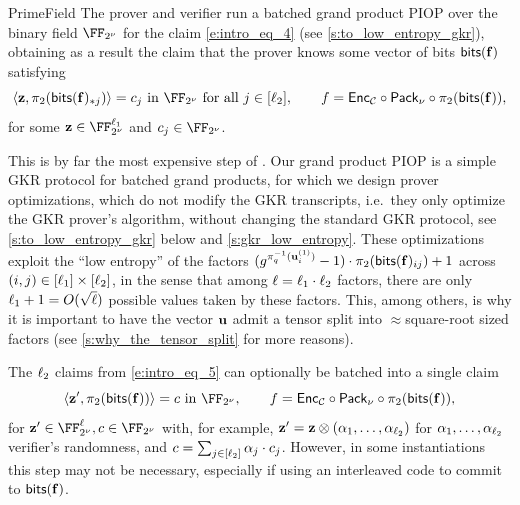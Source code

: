 \begin{lncsmove}{PrimeField}
        The prover and verifier run  a batched grand product PIOP over the binary field $\comfield$ for the claim  \eqref{e:intro_eq_4} (see \cref{s:to_low_entropy_gkr}), obtaining as a result the claim that the prover knows some vector of bits $\mathsf{bits}(\mathbf{f})$ satisfying
        \begin{equation}\label{e:intro_eq_5} \langle \zz, \pi_2(\bitstext(\bff)_{*j}) \rangle = c_j \ \text{in  } \comfield \ \text{for all } j\in [\codedim_2], \qquad f = \Enc_\cC\circ \pack \circ \pi_2(\bitstext(\bff)),
        \end{equation} 
        for some $\zz\in \comfield^{\codedim_1}$ and $c_j\in \comfield$. 



        This is by far the most expensive step of \ftwoz. Our grand product PIOP is a simple GKR protocol for batched grand products, for which we design prover optimizations, which do not modify the GKR  transcripts, i.e.\ they only optimize the GKR prover's algorithm, without changing the standard GKR protocol, see \cref{s:to_low_entropy_gkr} below and \cref{s:gkr_low_entropy}. These optimizations exploit the ``low entropy'' of the factors $(g^{\pi_q^{-1}(\mathbf{u}^{(1)}_i)}-1)\cdot \pi_2(\mathsf{bits}(\mathbf{f})_{ij}) +1$ across $(i,j)\in [\ell_1]\times [\ell_2]$, in the sense that among $\ell=\ell_1\cdot \ell_2$ factors, there are only $\ell_1+1=O(\sqrt{\ell})$ possible values taken by these factors.  This, among others, is why it is important to have the vector $\mathbf{u}$ admit a tensor split into $\approx$square-root sized factors (see \cref{s:why_the_tensor_split} for more reasons). %

 The  $\ell_2$ claims from \cref{e:intro_eq_5} can optionally be batched into  a single claim \begin{equation} \label{e:intro_eq_5_batched}\langle \zz', \pi_2(\bitstext(\bff)) \rangle = c \ \text{in  } \comfield, \qquad f = \Enc_\cC\circ \pack \circ \pi_2(\bitstext(\bff)),\end{equation} for  $\zz'\in \comfield^{\codedim}, c\in \comfield$ with, for example, $\mathbf{z}'=\mathbf{z}\otimes(\alpha_1,\ldots, \alpha_{\ell_2})$ for $\alpha_1, \ldots, \alpha_{\ell_2}$ verifier's randomness, and $c=\sum_{j\in [\ell_2]} \alpha_j\cdot c_j$. 
        However, in some instantiations this step may not be necessary, especially if using an interleaved code to commit to $\mathsf{bits}(\mathbf{f})$. 

\end{lncsmove}

